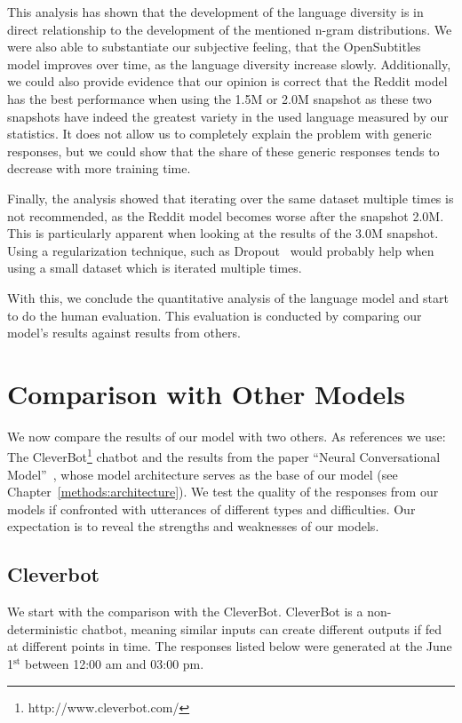 This analysis has shown that the development of the language diversity is in direct relationship to the development of the mentioned n-gram distributions. We were also able to substantiate our subjective feeling, that the OpenSubtitles model improves over time, as the language diversity increase slowly. Additionally, we could also provide evidence that our opinion is correct that the Reddit model has the best performance when using the 1.5M or 2.0M snapshot as these two snapshots have indeed the greatest variety in the used language measured by our statistics. It does not allow us to completely explain the problem with generic responses, but we could show that the share of these generic responses tends to decrease with more training time.

Finally, the analysis showed that iterating over the same dataset multiple times is not recommended, as the Reddit model becomes worse after the snapshot 2.0M. This is particularly apparent when looking at the results of the 3.0M snapshot. Using a regularization technique, such as Dropout~\cite{Nitish:2014} would probably help when using a small dataset which is iterated multiple times.

With this, we conclude the quantitative analysis of the language model and start to do the human evaluation. This evaluation is conducted by comparing our model's results against results from others.

\section{Comparison with Other Models}
We now compare the results of our model with two others. As references we use: The CleverBot\footnote{http://www.cleverbot.com/} chatbot and the results from the paper ``Neural Conversational Model''~\cite{Vinyals:2015}, whose model architecture serves as the base of our model (see Chapter~\ref{methods:architecture}). We test the quality of the responses from our models if confronted with utterances of different types and difficulties. Our expectation is to reveal the strengths and weaknesses of our models.

\subsection{Cleverbot}
\label{results:comparison:cleverbot}
We start with the comparison with the CleverBot. CleverBot is a non-deterministic chatbot, meaning similar inputs can create different outputs if fed at different points in time. The responses listed below were generated at the June 1$^{\operatorname{st}}$ between 12:00 am and 03:00 pm.

